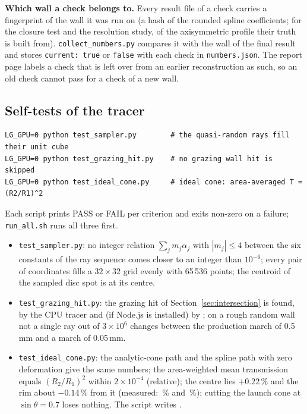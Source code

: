 \documentclass[11pt,a4paper]{article}
\newcommand{\code}[1]{\texttt{#1}}
\begin{document}
\textbf{Which wall a check belongs to.} Every result file of a check carries a fingerprint of the wall
it was run on (a hash of the rounded spline coefficients; for the closure test and the resolution
study, of the axisymmetric profile their truth is built from). \code{collect\_numbers.py} compares
it with the wall of the final result and stores \code{current: true} or \code{false} with each check
in \code{numbers.json}. The report page labels a check that is left over from an earlier
reconstruction as such, so an old check cannot pass for a check of a new wall.

\subsection{Self-tests of the tracer}

\begin{lstlisting}
LG_GPU=0 python test_sampler.py        # the quasi-random rays fill their unit cube
LG_GPU=0 python test_grazing_hit.py    # no grazing wall hit is skipped
LG_GPU=0 python test_ideal_cone.py     # ideal cone: area-averaged T = (R2/R1)^2
\end{lstlisting}
Each script prints PASS or FAIL per criterion and exits non-zero on a failure; \code{run\_all.sh}
runs all three first.
\begin{itemize}
\item \code{test\_sampler.py}: no integer relation $\sum_j m_j\alpha_j$ with $|m_j|\le4$ between the
six constants of the ray sequence comes closer to an integer than $10^{-6}$; every pair of
coordinates fills a $32\times32$ grid evenly with 65\,536 points; the centroid of the sampled disc
spot is at its centre.
\item \code{test\_grazing\_hit.py}: the grazing hit of Section~\ref{sec:intersection} is found, by the
CPU tracer and (if Node.js is installed) by ; on a rough random wall not a
single ray out of $3\times10^{6}$ changes between the production march of 0.5\,mm and a march of
0.05\,mm.
\item \code{test\_ideal\_cone.py}: the analytic-cone path and the spline path with zero deformation
give the same numbers; the area-weighted mean transmission equals $(R_2/R_1)^2$ within
$2\times10^{-4}$ (relative); the centre lies $+0.22\,\%$ and the rim about $-0.14\,\%$ from it
(measured: \IdealCentreDev\,\% and \IdealRimDev\,\%); cutting the launch cone at $\sin\theta=0.7$
loses nothing. The script writes .
\end{itemize}
\end{document}

